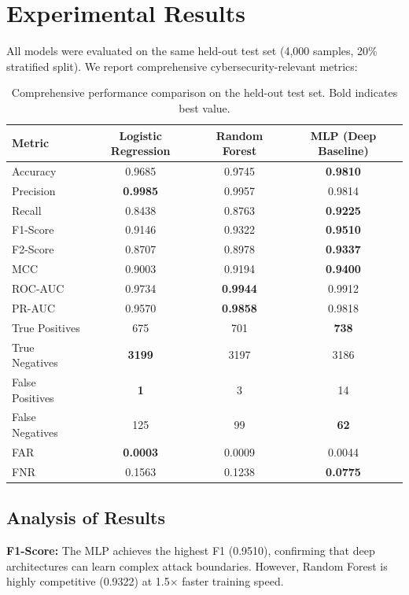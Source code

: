\documentclass[11pt,a4paper]{article}
\begin{document}
\section{Experimental Results}

All models were evaluated on the same held-out test set (4,000 samples, 20\% stratified split). We report comprehensive cybersecurity-relevant metrics:

\begin{table}[H]
\centering
\small
\begin{tabular}{lccc}
\toprule
\textbf{Metric} & \textbf{Logistic Regression} & \textbf{Random Forest} & \textbf{MLP (Deep Baseline)} \\
\midrule
Accuracy & 0.9685 & 0.9745 & \textbf{0.9810} \\
Precision & \textbf{0.9985} & 0.9957 & 0.9814 \\
Recall & 0.8438 & 0.8763 & \textbf{0.9225} \\
F1-Score & 0.9146 & 0.9322 & \textbf{0.9510} \\
F2-Score & 0.8707 & 0.8978 & \textbf{0.9337} \\
MCC & 0.9003 & 0.9194 & \textbf{0.9400} \\
ROC-AUC & 0.9734 & \textbf{0.9944} & 0.9912 \\
PR-AUC & 0.9570 & \textbf{0.9858} & 0.9818 \\
\midrule
True Positives & 675 & 701 & \textbf{738} \\
True Negatives & \textbf{3199} & 3197 & 3186 \\
False Positives & \textbf{1} & 3 & 14 \\
False Negatives & 125 & 99 & \textbf{62} \\
FAR & \textbf{0.0003} & 0.0009 & 0.0044 \\
FNR & 0.1563 & 0.1238 & \textbf{0.0775} \\
\bottomrule
\end{tabular}
\caption{Comprehensive performance comparison on the held-out test set. Bold indicates best value.}
\label{tab:results}
\end{table}

\subsection{Analysis of Results}
\textbf{F1-Score:} The MLP achieves the highest F1 (0.9510), confirming that deep architectures can learn complex attack boundaries. However, Random Forest is highly competitive (0.9322) at 1.5$\times$ faster training speed.
\end{document}
